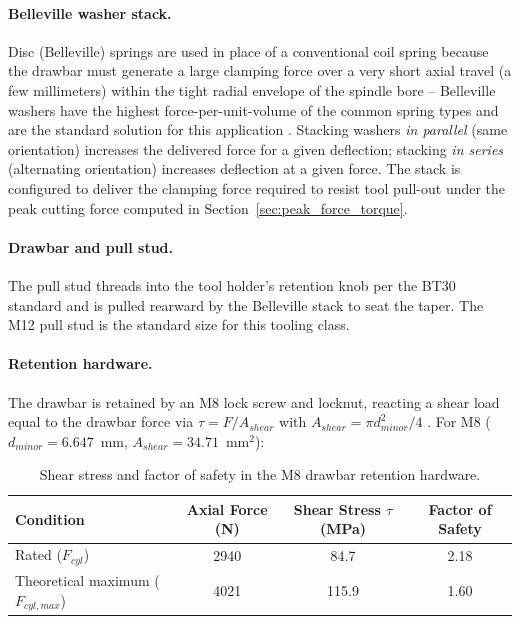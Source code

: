 \documentclass[12pt,a4paper]{report}
\begin{document}
	\paragraph{Belleville washer stack.} Disc (Belleville) springs are used in place of a
	conventional coil spring because the drawbar must generate a large clamping force over a
	very short axial travel (a few millimeters) within the tight radial envelope of the spindle
	bore -- Belleville washers have the highest force-per-unit-volume of the common spring types
	and are the standard solution for this application \cite{ref1}. Stacking washers
	\emph{in parallel} (same orientation) increases the delivered force for a given deflection;
	stacking \emph{in series} (alternating orientation) increases deflection at a given force.
	The stack is configured to deliver the clamping force required to resist tool pull-out under
	the peak cutting force computed in Section~\ref{sec:peak_force_torque}.
	
	\paragraph{Drawbar and pull stud.} The pull stud threads into the tool holder's retention
	knob per the BT30 standard and is pulled rearward by the Belleville stack to seat the taper.
	The M12 pull stud is the standard size for this tooling class.
	
	\paragraph{Retention hardware.} The drawbar is retained by an M8 lock screw and locknut,
	reacting a shear load equal to the drawbar force via $\tau = F/A_{shear}$ with
	$A_{shear} = \pi d_{minor}^2/4$ \cite{ref1}. For M8 ($d_{minor} = 6.647$~mm,
	$A_{shear} = 34.71$~mm$^2$):
	
	\begin{table}[htbp]
		\centering
		\caption{Shear stress and factor of safety in the M8 drawbar retention hardware.}
		\label{tab:retention_hardware}
		\begin{tabular}{lccc}
			\toprule
			Condition & Axial Force (N) & Shear Stress $\tau$ (MPa) & Factor of Safety \\
			\midrule
			Rated ($F_{cyl}$) & 2940 & 84.7 & 2.18 \\
			Theoretical maximum ($F_{cyl,max}$) & 4021 & 115.9 & 1.60 \\
			\bottomrule
		\end{tabular}
	\end{table}
	
\end{document}
